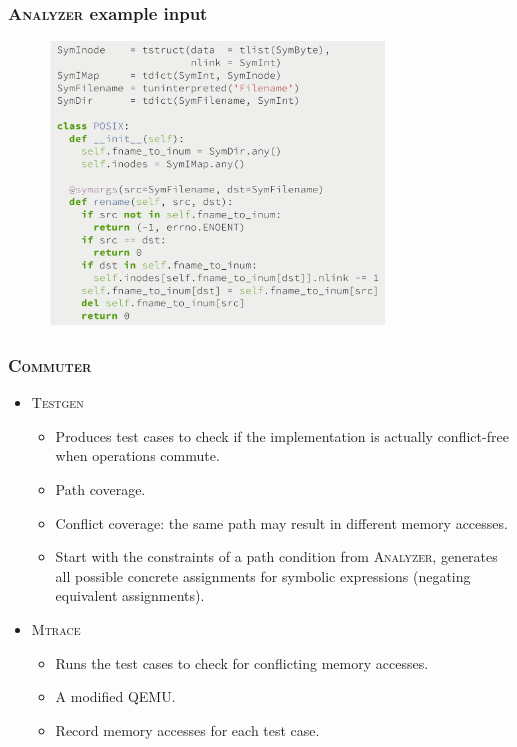 \documentclass{beamer}
\begin{document}
\begin{frame}
\frametitle{\textsc{Analyzer} example input}
\begin{figure}
   \includegraphics[width=0.8\textwidth]{799-s14-docs/commuter_rename.png}
 \end{figure}
\end{frame}

\begin{frame}
\frametitle{\textsc{Commuter}}
\begin{itemize}
\item \textsc{Testgen}
\begin{itemize}
  \item Produces test cases to check if the implementation is actually 
    conflict-free when operations commute.
  \item Path coverage.
  \item Conflict coverage: the same path may result in different memory accesses.
  \item Start with the constraints of a path condition from \textsc{Analyzer}, 
    generates all possible concrete assignments for symbolic expressions 
    (negating equivalent assignments).
\end{itemize}

\item \textsc{Mtrace}
\begin{itemize}
\item Runs the test cases to check for conflicting memory accesses.
\item A modified QEMU.
\item Record memory accesses for each test case.
\end{itemize}

\end{itemize}
\end{frame}
\end{document}
